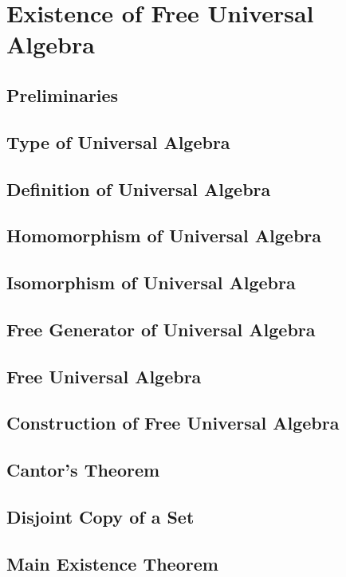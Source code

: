 \section{Existence of Free Universal Algebra}
    \subsection{Preliminaries}
      
    \subsection{Type of Universal Algebra}
      
    \subsection{Definition of Universal Algebra}
      
    \subsection{Homomorphism of Universal Algebra}
      
    \subsection{Isomorphism of Universal Algebra}
      
    \subsection{Free Generator of Universal Algebra}
      
    \subsection{Free Universal Algebra}
      
    \subsection{Construction of Free Universal Algebra}
      
    \subsection{Cantor's Theorem} 
      
    \subsection{Disjoint Copy of a Set}
      
    \subsection{Main Existence Theorem}
      
